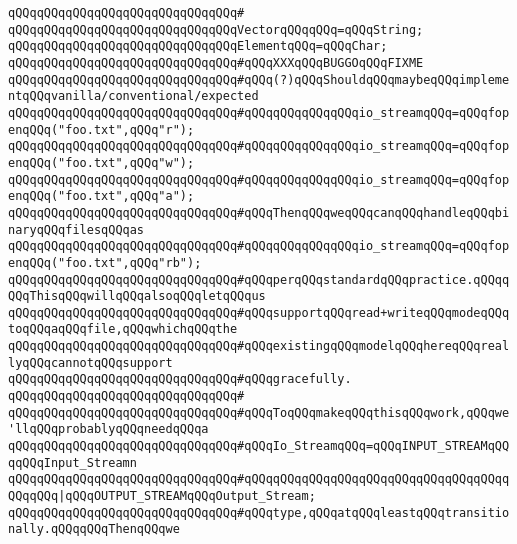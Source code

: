 \verb|qQQqqQQqqQQqqQQqqQQqqQQqqQQqqQQq#|\newline
\verb|qQQqqQQqqQQqqQQqqQQqqQQqqQQqqQQqVectorqQQqqQQq=qQQqString;|\newline
\verb|qQQqqQQqqQQqqQQqqQQqqQQqqQQqqQQqElementqQQq=qQQqChar;|\newline
\newline
\verb|qQQqqQQqqQQqqQQqqQQqqQQqqQQqqQQq#qQQqXXXqQQqBUGGOqQQqFIXME|\newline
\verb|qQQqqQQqqQQqqQQqqQQqqQQqqQQqqQQq#qQQq(?)qQQqShouldqQQqmaybeqQQqimplementqQQqvanilla/conventional/expected|\newline
\verb|qQQqqQQqqQQqqQQqqQQqqQQqqQQqqQQq#qQQqqQQqqQQqqQQqio_streamqQQq=qQQqfopenqQQq("foo.txt",qQQq"r");|\newline
\verb|qQQqqQQqqQQqqQQqqQQqqQQqqQQqqQQq#qQQqqQQqqQQqqQQqio_streamqQQq=qQQqfopenqQQq("foo.txt",qQQq"w");|\newline
\verb|qQQqqQQqqQQqqQQqqQQqqQQqqQQqqQQq#qQQqqQQqqQQqqQQqio_streamqQQq=qQQqfopenqQQq("foo.txt",qQQq"a");|\newline
\verb|qQQqqQQqqQQqqQQqqQQqqQQqqQQqqQQq#qQQqThenqQQqweqQQqcanqQQqhandleqQQqbinaryqQQqfilesqQQqas|\newline
\verb|qQQqqQQqqQQqqQQqqQQqqQQqqQQqqQQq#qQQqqQQqqQQqqQQqio_streamqQQq=qQQqfopenqQQq("foo.txt",qQQq"rb");|\newline
\verb|qQQqqQQqqQQqqQQqqQQqqQQqqQQqqQQq#qQQqperqQQqstandardqQQqpractice.qQQqqQQqThisqQQqwillqQQqalsoqQQqletqQQqus|\newline
\verb|qQQqqQQqqQQqqQQqqQQqqQQqqQQqqQQq#qQQqsupportqQQqread+writeqQQqmodeqQQqtoqQQqaqQQqfile,qQQqwhichqQQqthe|\newline
\verb|qQQqqQQqqQQqqQQqqQQqqQQqqQQqqQQq#qQQqexistingqQQqmodelqQQqhereqQQqreallyqQQqcannotqQQqsupport|\newline
\verb|qQQqqQQqqQQqqQQqqQQqqQQqqQQqqQQq#qQQqgracefully.|\newline
\verb|qQQqqQQqqQQqqQQqqQQqqQQqqQQqqQQq#|\newline
\verb|qQQqqQQqqQQqqQQqqQQqqQQqqQQqqQQq#qQQqToqQQqmakeqQQqthisqQQqwork,qQQqwe'llqQQqprobablyqQQqneedqQQqa|\newline
\verb|qQQqqQQqqQQqqQQqqQQqqQQqqQQqqQQq#qQQqIo_StreamqQQq=qQQqINPUT_STREAMqQQqqQQqInput_Streamn|\newline
\verb|qQQqqQQqqQQqqQQqqQQqqQQqqQQqqQQq#qQQqqQQqqQQqqQQqqQQqqQQqqQQqqQQqqQQqqQQqqQQq|\verb#|qQQqOUTPUT_STREAMqQQqOutput_Stream;#\newline
\verb|qQQqqQQqqQQqqQQqqQQqqQQqqQQqqQQq#qQQqtype,qQQqatqQQqleastqQQqtransitionally.qQQqqQQqThenqQQqwe|\newline
